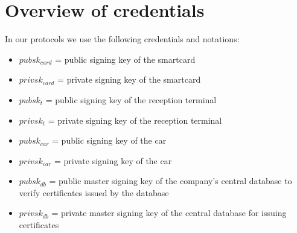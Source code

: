\documentclass[a4paper]{article}
\begin{document}

\section{Overview of credentials}
In our protocols we use the following credentials and notations:
\begin{itemize}
    \item $pubsk_{card}$ = public signing key of the smartcard
    \item $privsk_{card}$ = private signing key of the smartcard
    \item $pubsk_t$ = public signing key of the reception terminal
    \item $privsk_t$ = private signing key of the reception terminal
    \item $pubsk_{car}$ = public signing key of the car
    \item $privsk_{car}$ = private signing key of the car
    \item $pubsk_{db}$ = public master signing key of the company's central database to verify certificates issued by the database
    \item $privsk_{db}$ = private master signing key of the central database for issuing certificates
\end{itemize}
\end{document}
